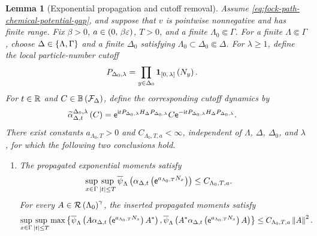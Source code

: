 \documentclass[11pt,a4paper]{article}
\theoremstyle{plain}
\newtheorem{lem}[thm]{Lemma}
\theoremstyle{definition}
\theoremstyle{remark}
\begin{document}
\begin{lem}[Exponential propagation and cutoff removal]\label{lem:fock-exponential-cutoff-removal}
Assume \eqref{eq:fock-path-chemical-potential-gap}, and suppose that $v$ is pointwise nonnegative and has
finite range.
Fix $\beta>0$, $a \in \left( 0,\,\beta\varepsilon \right)$, $T > 0$, and a finite $\Lambda_0 \Subset \Gamma$.
For a finite $\Lambda\Subset\Gamma$, choose $\Delta\in\left\{ \Lambda,\Gamma \right\}$ and a finite $\Delta_0$ satisfying
$\Lambda_0\subset \Delta_0\Subset \Delta$.
For $\lambda\geq1$, define the local particle-number cutoff
$$\begin{aligned}
P_{\Delta_0,\lambda}
& =
\prod_{y \in \Delta_0}\boldsymbol{1}_{\left[ 0,\,\lambda \right]} \left( N_y \right).
\end{aligned}$$
For $t\in\mathbb{R}$ and $C\in\opspbddlin{\sphilb{F}_{\Delta}}$, define the corresponding cutoff dynamics by
$$\begin{aligned}
\fun{\widetilde{\alpha}_{\Delta,t}^{\Delta_0,\lambda}}{C}
& =
\napiernum^{\imunit t P_{\Delta_0,\lambda}H_{\Delta}P_{\Delta_0,\lambda}}
C
\napiernum^{-\imunit t P_{\Delta_0,\lambda}H_{\Delta}P_{\Delta_0,\lambda}}.
\end{aligned}$$
There exist constants $a_{\Lambda_0,T}>0$ and $C_{\Lambda_0,T,a}<\infty$, independent of
$\Lambda$, $\Delta$, $\Delta_0$, and $\lambda$, for which the following two conclusions hold.
\begin{enumerate}
\item
The propagated exponential moments satisfy
\begin{equation}
\begin{aligned}
\sup_{x \in \Gamma}
\sup_{\abs{t} \leq T}
\fun{\oastate[\overline{\psi}_{\Lambda}]}{
\fun{\alpha_{\Delta,t}}{\napiernum^{a_{\Lambda_0,T}N_x}}}
& \leq
C_{\Lambda_0,T,a}.
\end{aligned}
\label{eq:fock-exponential-moment-propagation}
\end{equation}
For every $A\in\mathcal{R} \left( \Lambda_0 \right)^{\gamma}$, the inserted propagated moments satisfy
\begin{equation}
\begin{aligned}
\sup_{x\in\Gamma}
\sup_{\abs{t}\leq T}
\max\setone{
\fun{\oastate[\overline{\psi}_{\Lambda}]}{
A\fun{\alpha_{\Delta,t}}{\napiernum^{a_{\Lambda_0,T}N_x}}\faadj{A}},
\fun{\oastate[\overline{\psi}_{\Lambda}]}{
\faadj{A}\fun{\alpha_{\Delta,t}}{\napiernum^{a_{\Lambda_0,T}N_x}}A}}
& \leq
C_{\Lambda_0,T,a}\norm{A}^{2}.
\end{aligned}
\label{eq:fock-propagated-inserted-exponential-moment-bound}
\end{equation}


\end{enumerate}
\end{lem}
\end{document}
